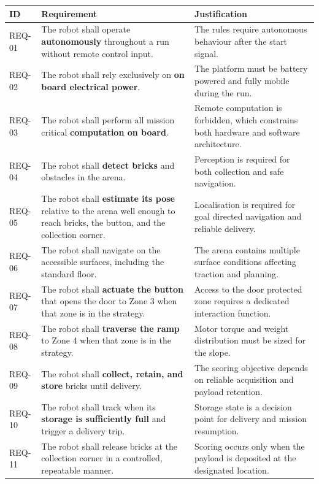 \documentclass[11pt]{article}
\begin{document}
\begin{table}[H]
\centering
\small
\begin{tabularx}{\linewidth}{|l|Y|Y|}
\hline
\textbf{ID} & \textbf{Requirement} & \textbf{Justification} \\
\hline
REQ-01 & The robot shall operate \textbf{autonomously} throughout a run without remote control input. & The rules require autonomous behaviour after the start signal. \\
\hline
REQ-02 & The robot shall rely exclusively on \textbf{on board electrical power}. & The platform must be battery powered and fully mobile during the run. \\
\hline
REQ-03 & The robot shall perform all mission critical \textbf{computation on board}. & Remote computation is forbidden, which constrains both hardware and software architecture. \\
\hline
REQ-04 & The robot shall \textbf{detect bricks} and obstacles in the arena. & Perception is required for both collection and safe navigation. \\
\hline
REQ-05 & The robot shall \textbf{estimate its pose} relative to the arena well enough to reach bricks, the button, and the collection corner. & Localisation is required for goal directed navigation and reliable delivery. \\
\hline
REQ-06 & The robot shall navigate on the accessible surfaces, including the standard floor. & The arena contains multiple surface conditions affecting traction and planning. \\
\hline
REQ-07 & The robot shall \textbf{actuate the button} that opens the door to Zone 3 when that zone is in the strategy. & Access to the door protected zone requires a dedicated interaction function. \\
\hline
REQ-08 & The robot shall \textbf{traverse the ramp} to Zone 4 when that zone is in the strategy. & Motor torque and weight distribution must be sized for the slope. \\
\hline
REQ-09 & The robot shall \textbf{collect, retain, and store} bricks until delivery. & The scoring objective depends on reliable acquisition and payload retention. \\
\hline
REQ-10 & The robot shall track when its \textbf{storage is sufficiently full} and trigger a delivery trip. & Storage state is a decision point for delivery and mission resumption. \\
\hline
REQ-11 & The robot shall release bricks at the collection corner in a controlled, repeatable manner. & Scoring occurs only when the payload is deposited at the designated location. \\

\end{tabularx}
\end{table}
\end{document}
